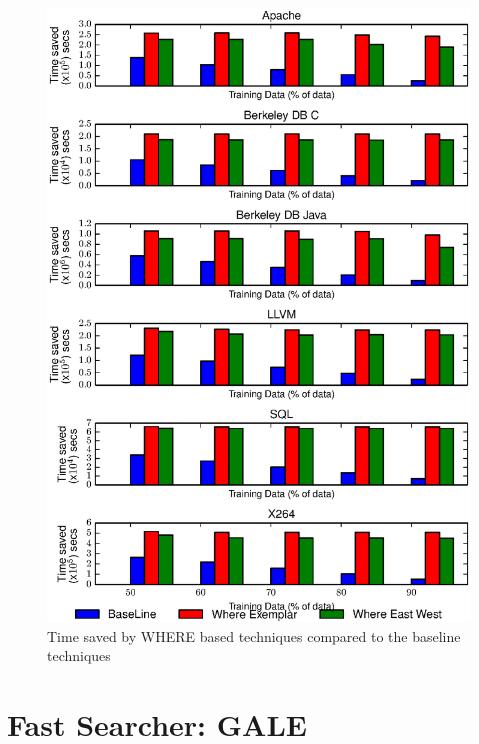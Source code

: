 \documentclass{sig-alternative}
\begin{document}
\begin{figure}[!t]
\includegraphics[width=0.9\linewidth]{Figures/performance_graph.eps}
\caption{Time saved by WHERE based techniques compared to the baseline techniques }\label{fig:performance_graph}
\end{figure}

\section{Fast Searcher: GALE}
\end{document}

